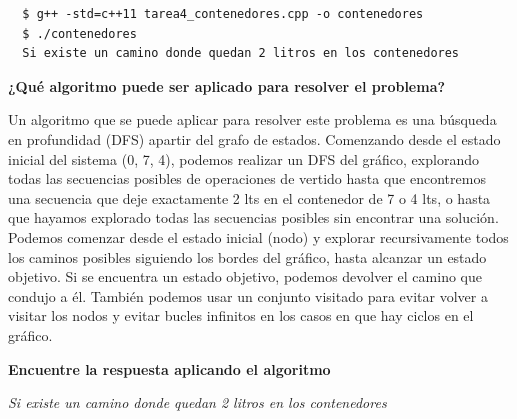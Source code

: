 \documentclass{article}
\begin{document}
\begin{commandline}
\begin{verbatim}
  $ g++ -std=c++11 tarea4_contenedores.cpp -o contenedores
  $ ./contenedores
  Si existe un camino donde quedan 2 litros en los contenedores
\end{verbatim}
\end{commandline}

\begin{question}
  \textbf{¿Qué algoritmo puede ser aplicado para resolver el problema?}\\
\end{question}

Un algoritmo que se puede aplicar para resolver este problema es una búsqueda en profundidad (DFS) apartir del grafo de estados. Comenzando desde el estado inicial del sistema (0, 7, 4), podemos realizar un DFS del gráfico, explorando todas las secuencias posibles de operaciones de vertido hasta que encontremos una secuencia que deje exactamente 2 lts en el contenedor de  7 o 4 lts, o hasta que hayamos explorado todas las secuencias posibles sin encontrar una solución.\\

Podemos comenzar desde el estado inicial (nodo) y explorar recursivamente todos los caminos posibles siguiendo los bordes del gráfico, hasta alcanzar un estado objetivo. Si se encuentra un estado objetivo, podemos devolver el camino que condujo a él. También podemos usar un conjunto visitado para evitar volver a visitar los nodos y evitar bucles infinitos en los casos en que hay ciclos en el gráfico.\\

\begin{question}
  \textbf{Encuentre la respuesta aplicando el algoritmo}\\
\end{question}
\textit{Si existe un camino donde quedan 2 litros en los contenedores}
\end{document}
